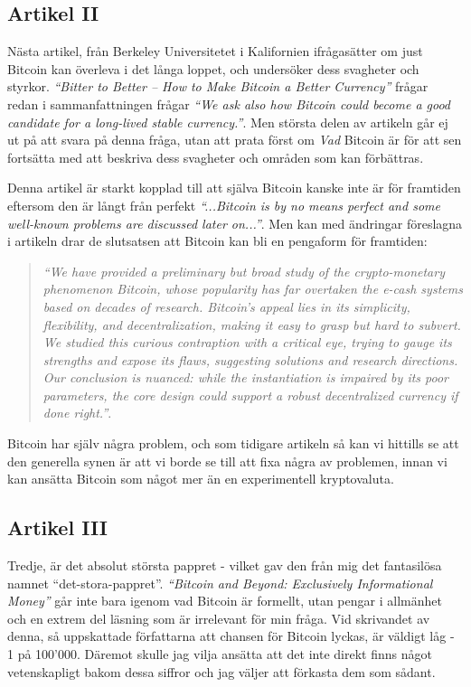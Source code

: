 \documentclass[a4paper,11pt,exjobb]{kth-mag}
\begin{document}
\subsection{Artikel II}
Nästa artikel, från Berkeley Universitetet i Kalifornien ifrågasätter om just Bitcoin kan överleva i det långa loppet, och undersöker dess svagheter och styrkor.  \textit{``Bitter to Better -- How to Make Bitcoin a Better Currency''}\cite{scoop3} frågar redan i sammanfattningen frågar \textit{``We ask also how Bitcoin could become a good candidate for a long-lived stable currency.''}. Men största delen av artikeln går ej ut på att svara på denna fråga, utan att prata först om \textit{Vad} Bitcoin är för att sen fortsätta med att beskriva dess svagheter och områden som kan förbättras.

Denna artikel är starkt kopplad till att själva Bitcoin kanske inte är för framtiden eftersom den är långt från perfekt \textit{``...Bitcoin is by no means perfect and some well-known problems are discussed later on...''}\cite[p.400]{scoop3}. Men kan med ändringar föreslagna i artikeln drar de slutsatsen att Bitcoin kan bli en pengaform för framtiden:

\begin{quote}
\textit{``We have provided a preliminary but broad study of the crypto-monetary phenomenon
Bitcoin, whose popularity has far overtaken the e-cash systems based on decades of
research. Bitcoin’s appeal lies in its simplicity, flexibility, and decentralization, making
it easy to grasp but hard to subvert. We studied this curious contraption with a critical
eye, trying to gauge its strengths and expose its flaws, suggesting solutions and research
directions. Our conclusion is nuanced: while the instantiation is impaired by its poor
parameters, the core design could support a robust decentralized currency if done right.''}\cite[p.414]{scoop3}.
\end{quote}

Bitcoin har själv några problem, och som tidigare artikeln så kan vi hittills se att den generella synen är att vi borde se till att fixa några av problemen, innan vi kan ansätta Bitcoin som något mer än en experimentell kryptovaluta.

\subsection{Artikel III}
Tredje, är det absolut största pappret - vilket gav den från mig det fantasilösa namnet ``det-stora-pappret''.  \textit{``Bitcoin and Beyond: Exclusively Informational Money''}\cite{bitsc} går inte bara igenom vad Bitcoin är formellt, utan pengar i allmänhet och en extrem del läsning som är irrelevant för min fråga. Vid skrivandet av denna, så uppskattade författarna att chansen för Bitcoin lyckas, är väldigt låg - 1 på 100'000\cite[p.16]{bitsc}. Däremot skulle jag vilja ansätta att det inte direkt finns något vetenskapligt bakom dessa siffror och jag väljer att förkasta dem som sådant. 
\end{document}

